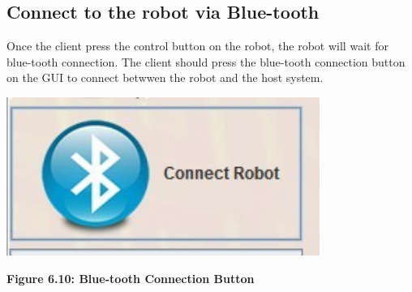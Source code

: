 \documentclass[11pt, a4paper]{report}
\begin{document}
\subsection{Connect to the robot via Blue-tooth}
Once the client press the control button on the robot, the robot will wait for blue-tooth connection. The client should press the blue-tooth connection button on the GUI to connect betwwen the robot and the host system.
 \begin{center}
 \includegraphics[width=10.20cm]{ConnectButton.jpg}
\end{center}
\begin{center}
\textbf {Figure 6.10: Blue-tooth Connection Button } \\[0.3cm]
\end{center}
\end{document}
